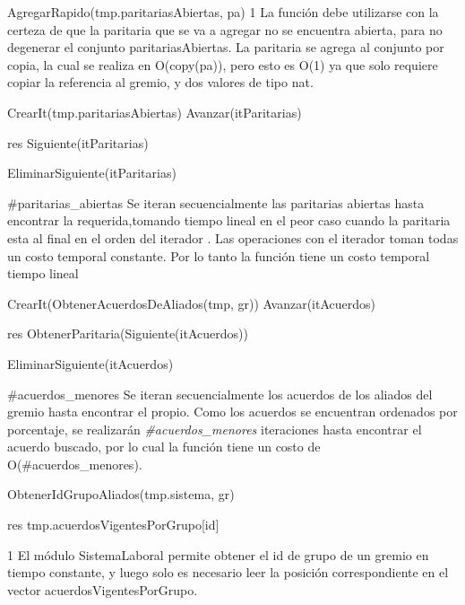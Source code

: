 {
	\state AgregarRapido(tmp.paritariasAbiertas, pa)		
}
{1}
{ La funci\'on debe utilizarse con la certeza de que la paritaria que se va a agregar no se encuentra abierta, para no degenerar el conjunto paritariasAbiertas. La paritaria se agrega al conjunto por copia, la cual se realiza en O(copy(pa)), pero esto es O(1) ya que solo requiere copiar la referencia al gremio, y dos valores de tipo nat. }

{
	\state {} \asig CrearIt(tmp.paritariasAbiertas)		
			
		\state
		\state Avanzar(itParitarias)								
	\endwhile
	\state

	\state res \asig Siguiente(itParitarias)						

	\state EliminarSiguiente(itParitarias)							
}
{\#paritarias\_abiertas}
{Se iteran secuencialmente las paritarias abiertas hasta encontrar la requerida,tomando tiempo lineal en el peor caso cuando la paritaria esta al final en el orden del iterador
. Las operaciones con el iterador toman todas un costo temporal constante. Por lo tanto la funci\'on tiene un costo temporal tiempo lineal
}

{
	\state {} \asig CrearIt(ObtenerAcuerdosDeAliados(tmp, gr))		
			
		\state
		\state Avanzar(itAcuerdos)  								
	\endwhile
	\state

	\state res \asig ObtenerParitaria(Siguiente(itAcuerdos))		

	\state EliminarSiguiente(itAcuerdos)							
}
{\#acuerdos\_menores}
{Se iteran secuencialmente los acuerdos de los aliados del gremio hasta encontrar el propio. Como los acuerdos se encuentran ordenados por porcentaje, se realizar\'an \emph{\#acuerdos\_menores} iteraciones hasta encontrar el acuerdo buscado, por lo cual la funci\'on tiene un costo de O(\#acuerdos\_menores). }

{
	\state {} \asig ObtenerIdGrupoAliados(tmp.sistema, gr)		

	\state res \asig tmp.acuerdosVigentesPorGrupo[id]							
}
{1}
{ El m\'odulo SistemaLaboral permite obtener el id de grupo de un gremio en tiempo constante, y luego solo es necesario leer la posici\'on correspondiente en el vector acuerdosVigentesPorGrupo. }


